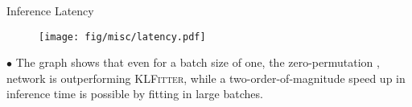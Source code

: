 






\begin{frame}[fragile]{Inference Latency}
    \begin{figure}
        \centering
        \texttt{[image: fig/misc/latency.pdf]}
    \end{figure}
    \medskip
    $\bullet$ The graph shows that even for a batch size of one, the zero-permutation \saja, network is outperforming \textsc{KLFitter}, while a two-order-of-magnitude speed up in inference time is possible by fitting in large batches.
\end{frame}



